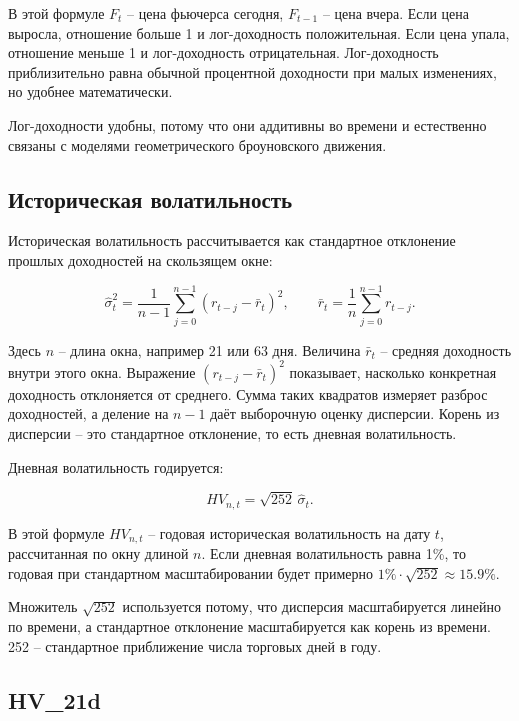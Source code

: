 \documentclass[11pt,a4paper]{article}
\begin{document}
В этой формуле $F_t$ -- цена фьючерса сегодня, $F_{t-1}$ -- цена вчера. Если цена выросла, отношение больше 1 и лог-доходность положительная. Если цена упала, отношение меньше 1 и лог-доходность отрицательная. Лог-доходность приблизительно равна обычной процентной доходности при малых изменениях, но удобнее математически.

Лог-доходности удобны, потому что они аддитивны во времени и естественно связаны с моделями геометрического броуновского движения.

\subsection{Историческая волатильность}

Историческая волатильность рассчитывается как стандартное отклонение прошлых доходностей на скользящем окне:

\begin{equation}
\hat{\sigma}^2_t =
\frac{1}{n-1}
\sum_{j=0}^{n-1}
\left(r_{t-j}-\bar r_t\right)^2,
\qquad
\bar r_t =
\frac{1}{n}
\sum_{j=0}^{n-1} r_{t-j}.
\end{equation}

Здесь $n$ -- длина окна, например 21 или 63 дня. Величина $\bar r_t$ -- средняя доходность внутри этого окна. Выражение $(r_{t-j}-\bar r_t)^2$ показывает, насколько конкретная доходность отклоняется от среднего. Сумма таких квадратов измеряет разброс доходностей, а деление на $n-1$ даёт выборочную оценку дисперсии. Корень из дисперсии -- это стандартное отклонение, то есть дневная волатильность.

Дневная волатильность годируется:

\begin{equation}
HV_{n,t}=\sqrt{252}\,\hat{\sigma}_t.
\end{equation}

В этой формуле $HV_{n,t}$ -- годовая историческая волатильность на дату $t$, рассчитанная по окну длиной $n$. Если дневная волатильность равна 1\%, то годовая при стандартном масштабировании будет примерно $1\%\cdot\sqrt{252}\approx15.9\%$.

Множитель $\sqrt{252}$ используется потому, что дисперсия масштабируется линейно по времени, а стандартное отклонение масштабируется как корень из времени. 252 -- стандартное приближение числа торговых дней в году.

\subsection{HV\_21d}
\end{document}
